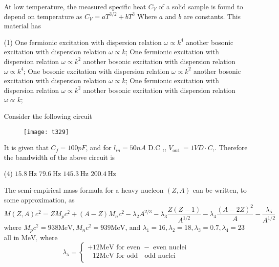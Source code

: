 \begin{questions}
\begin{minipage}{\textwidth}
	\question At low temperature, the measured specific heat $C_{V}$ of a solid sample is found to depend on temperature as $C_{V}=a T^{3 / 2}+b T^{3}$
	Where $a$ and $b$ are constants. This material has
\end{minipage}
\begin{tasks}(1)
	\task[\textbf{A.}] One fermionic excitation with dispersion relation $\omega \propto k^{4}$ another bosonic excitation with dispersion relation $\omega \propto k$;
	\task[\textbf{B.}] One fermionic excitation with dispersion relation $\omega \propto k^{2}$ another bosonic excitation with dispersion relation $\omega \propto k^{4}$;
	\task[\textbf{C.}] One bosonic excitation with dispersion relation $\omega \propto k^{2}$ another bosonic excitation with dispersion relation $\omega \propto k$;
	\task[\textbf{D.}] One fermionic excitation with dispersion relation $\omega \propto k^{2}$ another bosonic excitation with dispersion relation $\omega \propto k$;
\end{tasks}
\begin{minipage}{\textwidth}
	\question Consider the following circuit\\
	\begin{figure}[H]
		\centering
		\texttt{[image: t329]}
	\end{figure}
	It is given that $C_{f}=100 p F$, and for $l_{i n}=50 n A$   D.C ,, $V_{\text {out }}=1 V D \cdot C$,. Therefore the bandwidth of the above circuit is
\end{minipage}
\begin{tasks}(4)
	\task[\textbf{A.}]   $15.8 \mathrm{~Hz}$
	\task[\textbf{B.}] $79.6 \mathrm{~Hz}$
	\task[\textbf{C.}] $145.3 \mathrm{~Hz}$
	\task[\textbf{D.}] $200.4 \mathrm{~Hz}$
\end{tasks}
\begin{minipage}{\textwidth}
	\question The semi-empirical mass formula for a heavy nucleon $(Z, A)$ can be written, to some approximation, as
	$$
	M(Z, A) c^{2}=Z M_{p} c^{2}+(A-Z) M_{n} c^{2}-\lambda_{2} A^{2 / 3}-\lambda_{3} \frac{Z(Z-1)}{A^{1 / 2}}-\lambda_{4} \frac{(A-2 Z)^{2}}{A}-\frac{\lambda_{5}}{A^{1 / 2}}
	$$
	where $M_{p} c^{2}=938 \mathrm{MeV}, M_{n} c^{2}=939 \mathrm{MeV}$, and $\lambda_{1}=16, \lambda_{2}=18, \lambda_{3}=0.7, \lambda_{4}=23$ all in $\mathrm{MeV}$, where
	$$
	\lambda_{5}=\left\{\begin{array}{c}
	+12 \mathrm{MeV} \text { for even }-\text { even nuclei } \\
	-12 \mathrm{MeV} \text { for odd - odd nuclei } \\

\end{array}$$
\end{minipage}
\end{questions}
